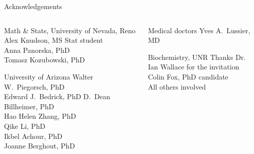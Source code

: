\documentclass[ignorenonframetext,aspectratio=169,]{beamer}
\begin{document}
\begin{frame}{%
\protect\hypertarget{acknowledgements}{%
Acknowledgements}}

\begin{columns}[T]
  \begin{column}{0.55\columnwidth}
    \begin{block}{Math \& Stats, University of Nevada, Reno}
      Alex Knudson, MS Stat student\\
      Anna Panorska, PhD\\
      Tomasz Kozubowski, PhD
    \end{block}
    \begin{block}{University of Arizona}
      Walter W.~Piegorsch, PhD\\
      Edward J.~Bedrick, PhD
      D.~Dean Billheimer, PhD\\
      Hao Helen Zhang, PhD\\
      Qike Li, PhD\\
      Ikbel Achour, PhD\\
      Joanne Berghout, PhD
    \end{block}
  \end{column}

\begin{column}{0.45\columnwidth}
    \begin{block}{Medical doctors}
      Yves A.~Lussier, MD
    \end{block}
    \begin{block}{Biochemistry, UNR}
      Thanks Dr. Ian Wallace for the invitation\\
      Colin Fox, PhD candidate\\
      All others involved
    \end{block}
  \end{column}
\end{columns}

\end{frame}
\end{document}
